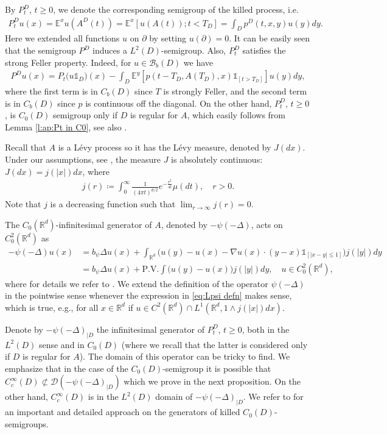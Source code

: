 \documentclass[reqno]{amsart}
\theoremstyle{remark}
\numberwithin{equation}{section} %
\newcommand{\Lpsi}{\psi(-\Delta)}
\newcommand{\LpsiD}{\Lpsi_{|D}}
\newcommand{\DD}{\mathcal{D}}
\newcommand{\1}{\mathds{1}}
\begin{document}
	By $P^D_t$, $t\ge0$, we denote the corresponding semigroup of the killed process, i.e.
	\begin{align}\label{eq:semigroup KSBM}
		P^D_tu(x)=\mathds{E}^xu(A^D(t))=\mathds{E}^x[u(A(t));t<T_D]=\int_Dp^D(t,x,y)u(y)dy.
	\end{align}
	Here we extended all functions $u$ on $\partial$ by setting $u(\partial)=0$. It can be easily seen that the semigroup $P^D$ induces a $L^2(D)$-semigroup. Also, $P^D_t$ satisfies the strong Feller property. Indeed, for $u\in \mathcal{B}_b(D)$ we have
	\begin{align*}
		P^Du(x)=P_t\big(u\mathds{1}_D\big)(x)-\int_D\mathds{E}^y[p(t-T_D,A({T_D}),x)\mathds{1}_{[t>T_D]}]u(y)dy,
	\end{align*}
	where the first term is in $C_b(D)$ since $T$ is strongly Feller, and the second term is in $C_b(D)$ since $p$ is continuous off the diagonal. On the other hand, $P^D_t$, $t\ge0$, is $C_0(D)$ semigroup only if $D$ is regular for $A$, which easily follows from Lemma \ref{l:ap:Pt in C0}, see also \cite{Chung-DoublyFeller-Seminar85}.
	
	
	
	Recall that  $A$ is a L\'evy process so it has the L\'evy measure, denoted by $J(dx)$. Under our assumptions, see \cite[Theorem 30.1]{sato}, the measure $J$ is absolutely continuous: $J(dx)=j(|x|)dx$, where 
	\begin{align*}
		j(r)\coloneqq\int_0^\infty \frac{1}{(4\pi t)^{d/2}}e^{-\frac{r^2}{4t}}\mu(dt),\quad r>0.
	\end{align*}
	Note that $j$ is a decreasing function such that $\lim_{r\to \infty} j(r)=0$.
	
	The $C_0(\mathbb{R}^d)$-infinitesimal generator of $A$, denoted by $-\Lpsi$, acts on $C_0^2(\mathbb{R}^d)$ as
	\begin{align}
		-\Lpsi u(x)&=b_\psi\Delta u(x)+\int_{\mathbb{R}^d}\big(u(y)-u(x)-\nabla u(x)\cdot (y-x)\mathds{1}_{[|x-y|\le 1]}\big)j(|y|)dy\nonumber\\
		&=b_\psi\Delta u(x)+\textrm{P.V.}\int\big(u(y)-u(x)\big)j(|y|)dy, \quad u\in C_0^2(\mathbb{R}^d),\label{eq:Lpsi defn}
	\end{align}
	where for details we refer to \cite{sato}.
	We extend the definition of the operator $\Lpsi$ in the pointwise sense whenever the expression in \eqref{eq:Lpsi defn} makes sense, which is  true, e.g., for all $x\in\mathbb{R}^d$ if $u\in C^{2}(\mathbb{R}^d)\cap L^1(\mathbb{R}^d,1\wedge j(|x|)dx)$.
	
	Denote by $-\LpsiD$ the infinitesimal generator of $P^D_t$, $t\ge0$, both in the $L^2(D)$ sense and in $C_0(D)$ (where we recall that the latter is considered only if $D$ is regular for $A$). The domain of this operator can be tricky to find. We emphasize that in the case of the $C_0(D)$-semigroup it is possible that   $C_c^\infty(D)\not\subset \DD(-\LpsiD)$ which we prove in the next proposition. On the other hand, $C_c^\infty(D)$ is in the $L^2(D)$ domain of $-\LpsiD$. We refer to \cite{BaeumerLuksMeersc-SpaceTime18} for an important and detailed approach on the generators of killed $C_0(D)$-semigroups.
	
\end{document}
